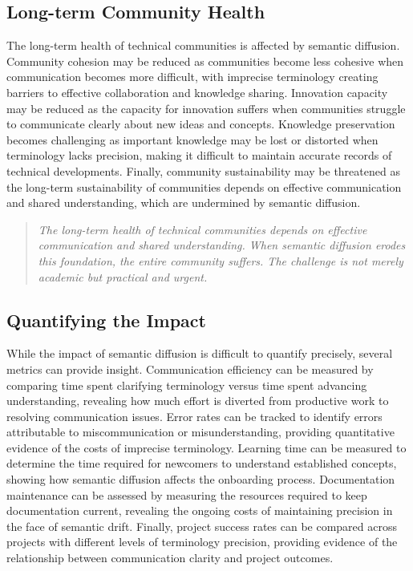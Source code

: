 \documentclass[11pt]{article}
\begin{document}
\subsection{Long-term Community Health}

The long-term health of technical communities is affected by semantic diffusion. Community cohesion may be reduced as communities become less cohesive when communication becomes more difficult, with imprecise terminology creating barriers to effective collaboration and knowledge sharing. Innovation capacity may be reduced as the capacity for innovation suffers when communities struggle to communicate clearly about new ideas and concepts. Knowledge preservation becomes challenging as important knowledge may be lost or distorted when terminology lacks precision, making it difficult to maintain accurate records of technical developments. Finally, community sustainability may be threatened as the long-term sustainability of communities depends on effective communication and shared understanding, which are undermined by semantic diffusion.

\begin{quote}
\emph{The long-term health of technical communities depends on effective communication and shared understanding. When semantic diffusion erodes this foundation, the entire community suffers. The challenge is not merely academic but practical and urgent.}
\end{quote}

\subsection{Quantifying the Impact}

While the impact of semantic diffusion is difficult to quantify precisely, several metrics can provide insight. Communication efficiency can be measured by comparing time spent clarifying terminology versus time spent advancing understanding, revealing how much effort is diverted from productive work to resolving communication issues. Error rates can be tracked to identify errors attributable to miscommunication or misunderstanding, providing quantitative evidence of the costs of imprecise terminology. Learning time can be measured to determine the time required for newcomers to understand established concepts, showing how semantic diffusion affects the onboarding process. Documentation maintenance can be assessed by measuring the resources required to keep documentation current, revealing the ongoing costs of maintaining precision in the face of semantic drift. Finally, project success rates can be compared across projects with different levels of terminology precision, providing evidence of the relationship between communication clarity and project outcomes.
\end{document}
